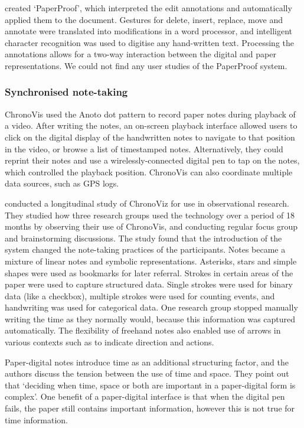 \citet{Weibel2008} created `PaperProof', which interpreted the edit annotations and automatically applied them to the
document. Gestures for delete, insert, replace, move and annotate were translated into modifications in a word
processor, and intelligent character recognition was used to digitise any hand-written text. Processing the annotations
allows for a two-way interaction between the digital and paper representations. We could not find any user studies of
the PaperProof system.

\subsubsection{Synchronised note-taking}

ChronoVis \citep{Fouse2011} used the Anoto dot pattern to record paper notes during playback of a video. After writing
the notes, an on-screen playback interface allowed users to click on the digital display of the handwritten notes to
navigate to that position in the video, or browse a list of timestamped notes. Alternatively, they could reprint their
notes and use a wirelessly-connected digital pen to tap on the notes, which controlled the playback position.
ChronoVis can also coordinate multiple data sources, such as GPS logs.

\citet{Weibel2012} conducted a longitudinal study of ChronoViz for use in observational research. They studied how
three research groups used the technology over a period of 18 months by observing their use of ChronoVis, and
conducting regular focus group and brainstorming discussions.  The study found that the introduction of the system
changed the note-taking practices of the participants.  Notes became a mixture of linear notes and symbolic
representations.  Asterisks, stars and simple shapes were used as bookmarks for later referral.  Strokes in certain
areas of the paper were used to capture structured data. Single strokes were used for binary data (like a checkbox),
multiple strokes were used for counting events, and handwriting was used for categorical data.  One research group
stopped manually writing the time as they normally would, because this information was captured automatically. The
flexibility of freehand notes also enabled use of arrows in various contexts such as to indicate direction and actions.

Paper-digital notes introduce time as an additional structuring factor, and the authors discuss the tension between the
use of time and space. They point out that `deciding when time, space or both are important in a paper-digital form is
complex'.  One benefit of a paper-digital interface is that when the digital pen fails, the paper still contains
important information, however this is not true for time information.

